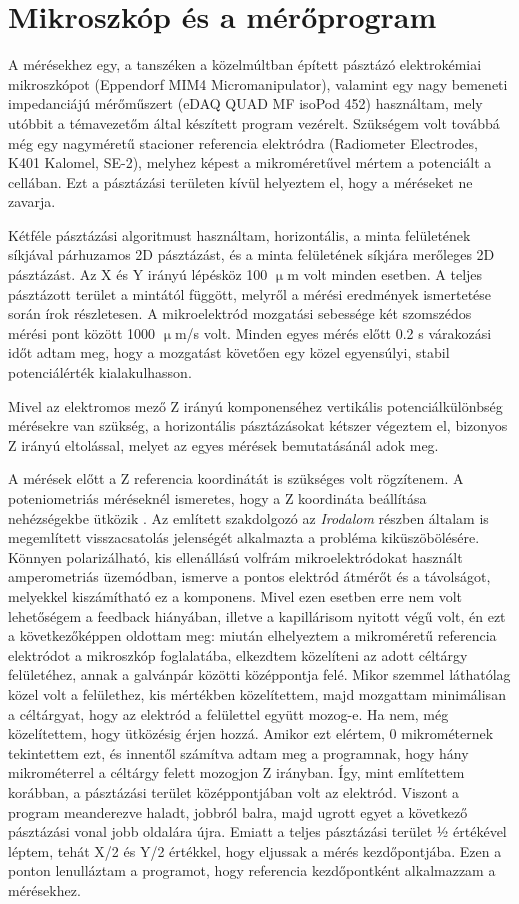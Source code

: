\section{Mikroszkóp és a mérőprogram}

A mérésekhez egy, a tanszéken a közelmúltban épített pásztázó elektrokémiai mikroszkópot (Eppendorf MIM4 Micromanipulator), valamint egy nagy bemeneti impedanciájú mérőműszert (eDAQ QUAD MF isoPod 452) használtam, mely utóbbit a témavezetőm által készített program vezérelt. Szükségem volt továbbá még egy nagyméretű stacioner referencia elektródra (Radiometer Electrodes, K401 Kalomel, SE-2), melyhez képest a mikroméretűvel mértem a potenciált a cellában. Ezt a pásztázási területen kívül helyeztem el, hogy a méréseket ne zavarja. 

Kétféle pásztázási algoritmust használtam, horizontális, a minta felületének síkjával párhuzamos 2D pásztázást, és a minta felületének síkjára merőleges 2D pásztázást. Az X és Y irányú lépésköz 100 $\upmu$m volt minden esetben. A teljes pásztázott terület a mintától függött, melyről a mérési eredmények ismertetése során írok részletesen. A mikroelektród mozgatási sebessége két szomszédos mérési pont között 1000 $\upmu$m/s volt. Minden egyes mérés előtt 0.2 s várakozási időt adtam meg, hogy a mozgatást követően egy közel egyensúlyi, stabil potenciálérték kialakulhasson.  

Mivel az elektromos mező Z irányú komponenséhez vertikális potenciálkülönbség mérésekre van szükség, a horizontális pásztázásokat kétszer végeztem el, bizonyos Z irányú eltolással, melyet az egyes mérések bemutatásánál adok meg.

A mérések előtt a Z referencia koordinátát is szükséges volt rögzítenem. A poteniometriás méréseknél ismeretes, hogy a Z koordináta beállítása nehézségekbe ütközik \cite{klucsikmsc}. Az említett szakdolgozó az \emph{Irodalom} részben általam is megemlített visszacsatolás jelenségét alkalmazta a probléma kiküszöbölésére. Könnyen polarizálható, kis ellenállású volfrám mikroelektródokat használt amperometriás üzemódban, ismerve a pontos elektród átmérőt és a távolságot, melyekkel kiszámítható ez a komponens. Mivel ezen esetben erre nem volt lehetőségem a feedback hiányában, illetve a kapillárisom nyitott végű volt, én ezt a következőképpen oldottam meg: miután elhelyeztem a mikroméretű referencia elektródot a mikroszkóp foglalatába, elkezdtem közelíteni az adott céltárgy felületéhez, annak a galvánpár közötti középpontja felé. Mikor szemmel láthatólag közel volt a felülethez, kis mértékben közelítettem, majd mozgattam minimálisan a céltárgyat, hogy az elektród a felülettel együtt mozog-e. Ha nem, még közelítettem, hogy ütközésig érjen hozzá. Amikor ezt elértem, 0 mikrométernek tekintettem ezt, és innentől számítva adtam meg a programnak, hogy hány mikrométerrel a céltárgy felett mozogjon Z irányban. Így, mint említettem korábban, a pásztázási terület középpontjában volt az elektród. Viszont a program meanderezve haladt, jobbról balra, majd ugrott egyet a következő pásztázási vonal jobb oldalára újra.  Emiatt a teljes pásztázási terület ½ értékével léptem, tehát X/2 és Y/2 értékkel, hogy eljussak a mérés kezdőpontjába. Ezen a ponton lenulláztam a programot, hogy referencia kezdőpontként alkalmazzam a mérésekhez.

